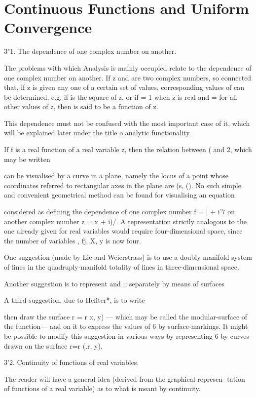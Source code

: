 \chapter{Continuous Functions and Uniform Convergence} 

3"1. The dependence of one complex number on another.

The problems with which Analysis is mainly occupied relate to the
dependence of one complex number on another. If z and are two complex
numbers, so connected that, if z is given any one of a certain set of
values, corresponding values of can be determined, e.g. if is the
square of z, or if = 1 when z is real and = for all other values of z,
then is said to be a function of z.

This dependence must not be confused with the most important case of
it, which will be explained later under the title o analytic
functionality.

If f is a real function of a real variable z, then the relation
between ( and 2, which may be written

can be visualised by a curve in a plane, namely the locus of a point
whose coordinates referred to rectangular axes in the plane are (s,
(). No such simple and convenient geometrical method can be found for
visualising an equation

considered as defining the dependence of one complex number f = | +
i'7 on another complex number z = x + i)/. A representation strictly
analogous to the one already given for real variables would require
four-dimensional space, since the number of variables , fj, X, y is
now four.

One suggestion (made by Lie and Weierstrass) is to use a
doubly-manifold system of lines in the quadruply-manifold totality of
lines in three-dimensional space.

Another suggestion is to represent and ;; separately by means of
surfaces

A third suggestion, due to Heffter*, is to write

then draw the surface r = r x, y) — which may be called the
modular-surface of the function— and on it to express the values of 6
by surface-markings. It might be possible to modify this suggestion in
various ways by representing 6 by curves drawn on the surface r=r (.r,
y).

3'2. Continuity of functions of real variables.

The reader will have a general idea (derived from the graphical
represen- tation of functions of a real variable) as to what is meant
by continuity.

